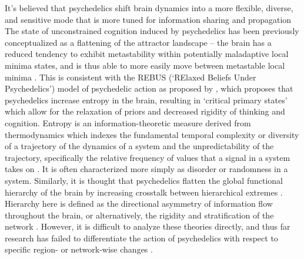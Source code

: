 It's believed that psychedelics shift brain dynamics into a more
flexible, diverse, and sensitive mode that is more tuned for information
sharing and propagation \parencite{Atasoy2017,Carhart-Harris2014, Carhart-Harris2017, Daws2022, Girn2022, Girn2023, Lord2019, Singleton2022, Tagliazucchi2014, Tagliazucchi2016, Timmermann2023} The state of unconstrained cognition induced by psychedelics has been previously conceptualized as a
flattening of the attractor landscape -- the brain
has a reduced tendency to exhibit metastability within potentially
maladaptive local minima states, and is thus able to more easily move
between metastable local minima \parencite{Carhart-Harris2007, Carhart-Harris2014, Kraehenmann2017, Kraehenmann2017a, Girn2023, Daws2022, Singleton2022}. This is consistent with the REBUS (`RElaxed Beliefs Under
Psychedelics') model of psychedelic action as proposed by \textcite{Carhart-Harris2019a}, which proposes that psychedelics increase
entropy in the brain, resulting in `critical primary states' which allow
for the relaxation of priors and decreased rigidity of thinking and
cognition. Entropy is an information-theoretic measure derived from
thermodynamics which indexes the fundamental temporal complexity or
diversity of a trajectory of the dynamics of a system and the
unpredictability of the trajectory, specifically the
relative frequency of values that a signal in a system takes on \parencite{Girn2023}. It is
often characterized more simply as disorder or randomness in a system.
Similarly, it is thought that psychedelics flatten the global functional
hierarchy of the brain by increasing crosstalk between hierarchical
extremes \parencite{Girn2022, Timmermann2023}. Hierarchy here is
defined as the directional asymmetry of information flow throughout the
brain, or alternatively, the rigidity and stratification of the network \parencite{Kringelbach2023}. However, it is difficult to analyze
these theories directly, and thus far research has failed to
differentiate the action of psychedelics with respect to specific
region- or network-wise changes \parencite{Girn2023}.

